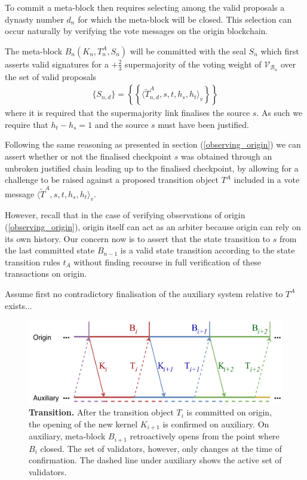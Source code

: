 \documentclass[12pt,a4paper]{article}
\begin{document}
To commit a meta-block then requires selecting among the valid proposals a dynasty number $d_n$ for which the meta-block will be closed.
This selection can occur naturally by verifying the vote messages on the origin blockchain.

The meta-block $B_n(K_n, T^A_n, S_n)$ will be committed with the seal $S_n$ which first asserts valid signatures for a $+\tfrac{2}{3}$ supermajority of the voting weight of $\mathcal{V}_{\mathcal{B}_n}$ over the set of valid proposals
\begin{align*}
  \{S_{n,d}\} = \left\{\left\{\langle\tilde{T}^A_{n,d}, s, t, h_s, h_t\rangle_v\right\}\right\}
\end{align*}
where it is required that the supermajority link finalises the source $s$.
As such we require that $h_t - h_s = 1$ and the source $s$ must have been justified.

Following the same reasoning as presented in section (\ref{observing_origin}) we can assert whether or not the finalised checkpoint $s$ was obtained through an unbroken justified chain leading up to the finalised checkpoint, by allowing for a challenge to be raised against a proposed transition object $T^A$ included in a vote message $\langle\tilde{T}^A, s, t, h_s, h_t\rangle_v$.

However, recall that in the case of verifying observations of origin (\ref{observing_origin}), origin itself can act as an arbiter because origin can rely on its own history.
Our concern now is to assert that the state transition to $s$ from the last committed state $B_{n-1}$ is a valid state transition according to the state transition rules $t_A$ without finding recourse in full verification of these transactions on origin.

Assume first no contradictory finalisation of the auxiliary system relative to $T^A$ exists...


\begin{figure}[htb]
    \centering
	\includegraphics[width=\textwidth]{transition}
	\caption{\textbf{Transition.}
		After the transition object $T_i$ is committed on origin, the opening of the new kernel $K_{i+1}$ is confirmed on auxiliary.
		On auxiliary, meta-block $B_{i+1}$ retroactively opens from the point where $B_i$ closed.
		The set of validators, however, only changes at the time of confirmation.
		The dashed line under auxiliary shows the active set of validators.
	}
	\label{fig:transition}
\end{figure}
\end{document}
